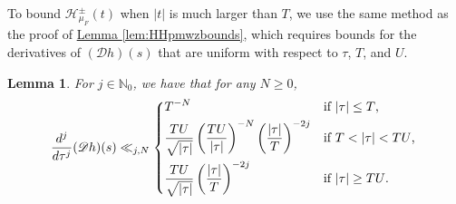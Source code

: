 \documentclass[11pt,a4paper]{amsart}
\newcommand{\Dscr}{\mathscr{D}}
\newcommand{\HH}{\mathcal{H}}
\newcommand{\N}{\mathbb{N}}
\numberwithin{equation}{section}
\newtheorem{lemma}[equation]{Lemma}
\theoremstyle{remark}
\theoremstyle{definition}
\begin{document}
To bound $\HH_{\mu_F}^{\pm}(t)$ when $|t|$ is much larger than $T$, we use the same method as the proof of \hyperref[lem:HHpmwzbounds]{Lemma \ref*{lem:HHpmwzbounds}}, which requires bounds for the derivatives of $(\Dscr h)(s)$ that are uniform with respect to $\tau$, $T$, and $U$.

\begin{lemma}
For $j \in \N_0$, we have that for any $N \geq 0$,
\begin{equation}
\label{eqn:Dscrhbounds}
\frac{d^j}{d\tau^j} (\Dscr h)(s) \ll_{j,N} \begin{dcases*}
T^{-N} & if $|\tau| \leq T$,	\\
\frac{TU}{\sqrt{|\tau|}} \left(\frac{TU}{|\tau|}\right)^{-N} \left(\frac{|\tau|}{T}\right)^{-2j} & if $T < |\tau| < TU$,	\\
\frac{TU}{\sqrt{|\tau|}} \left(\frac{|\tau|}{T}\right)^{-2j} & if $|\tau| \geq TU$.
\end{dcases*}
\end{equation}
\end{lemma}
\end{document}
